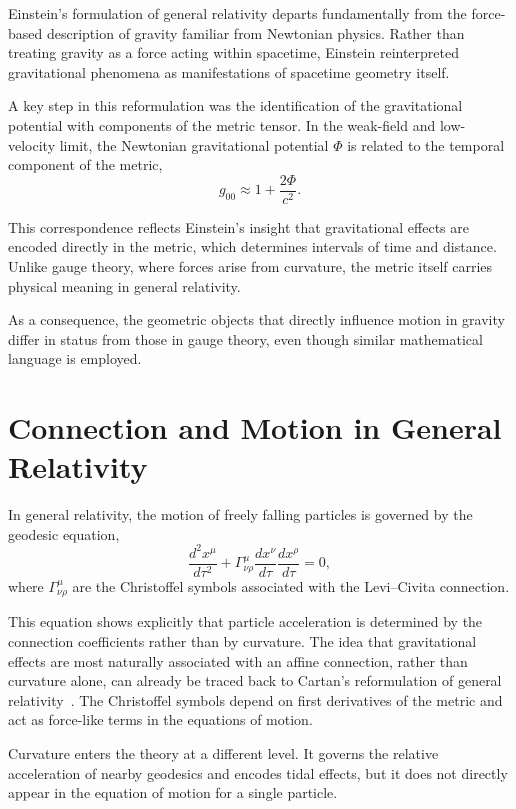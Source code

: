 \documentclass[12pt,letterpaper]{article} %
\begin{document}
\justifying
Einstein's formulation of general relativity departs fundamentally from the force-based description of gravity familiar from Newtonian physics. Rather than treating gravity as a force acting within spacetime, Einstein reinterpreted gravitational phenomena as manifestations of spacetime geometry itself.

A key step in this reformulation was the identification of the gravitational potential with components of the metric tensor. In the weak-field and low-velocity limit, the Newtonian gravitational potential $\Phi$ is related to the temporal component of the metric,
\begin{equation}
g_{00} \approx 1 + \frac{2\Phi}{c^2}.
\end{equation}

This correspondence reflects Einstein's insight that gravitational effects are encoded directly in the metric, which determines intervals of time and distance. Unlike gauge theory, where forces arise from curvature, the metric itself carries physical meaning in general relativity.

As a consequence, the geometric objects that directly influence motion in gravity differ in status from those in gauge theory, even though similar mathematical language is employed.


\section{Connection and Motion in General Relativity}

\justifying
In general relativity, the motion of freely falling particles is governed by the geodesic equation,
\begin{equation}
\frac{d^2 x^\mu}{d\tau^2} + \Gamma^\mu_{\nu\rho} \frac{dx^\nu}{d\tau} \frac{dx^\rho}{d\tau} = 0,
\end{equation}
where $\Gamma^\mu_{\nu\rho}$ are the Christoffel symbols associated with the Levi--Civita connection.

This equation shows explicitly that particle acceleration is determined by the connection coefficients rather than by curvature.
The idea that gravitational effects are most naturally associated with an affine connection, rather than curvature alone, can already be traced back to Cartan's reformulation of general relativity~\cite{Cartan}. The Christoffel symbols depend on first derivatives of the metric and act as force-like terms in the equations of motion.

Curvature enters the theory at a different level. It governs the relative acceleration of nearby geodesics and encodes tidal effects, but it does not directly appear in the equation of motion for a single particle.
\end{document}
